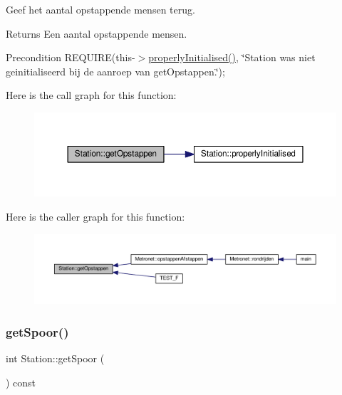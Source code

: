 Geef het aantal opstappende mensen terug. 

\begin{DoxyReturn}{Returns}
Een aantal opstappende mensen. 
\end{DoxyReturn}
\begin{DoxyPrecond}{Precondition}
R\+E\+Q\+U\+I\+RE(this-\/$>$\hyperlink{class_station_a9ce626dd0599e3ea8107404a59c21e16}{properly\+Initialised()}, \char`\"{}\+Station was niet geinitialiseerd bij de aanroep van get\+Opstappen.\char`\"{}); 
\end{DoxyPrecond}
Here is the call graph for this function\+:\nopagebreak
\begin{figure}[H]
\begin{center}
\leavevmode
\includegraphics[width=350pt]{class_station_a5897f83319093d502f01f18b24678aba_cgraph}
\end{center}
\end{figure}
Here is the caller graph for this function\+:\nopagebreak
\begin{figure}[H]
\begin{center}
\leavevmode
\includegraphics[width=350pt]{class_station_a5897f83319093d502f01f18b24678aba_icgraph}
\end{center}
\end{figure}
\mbox{\label{class_station_a081ca6373631199a30ebab56f50022d8}} 
\subsubsection{\texorpdfstring{get\+Spoor()}{getSpoor()}}
{\footnotesize\ttfamily int Station\+::get\+Spoor (\begin{DoxyParamCaption}{ }\end{DoxyParamCaption}) const}



